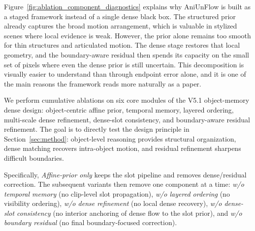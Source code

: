 Figure~\ref{fig:ablation_component_diagnostics} explains why AniUnFlow is built as a staged framework instead of a single dense black box. The structured prior already captures the broad motion arrangement, which is valuable in stylized scenes where local evidence is weak. However, the prior alone remains too smooth for thin structures and articulated motion. The dense stage restores that local geometry, and the boundary-aware residual then spends its capacity on the small set of pixels where even the dense prior is still uncertain. This decomposition is visually easier to understand than through endpoint error alone, and it is one of the main reasons the framework reads more naturally as a paper.

We perform cumulative ablations on six core modules of the V5.1 object-memory dense design: object-centric affine prior, temporal memory, layered ordering, multi-scale dense refinement, dense-slot consistency, and boundary-aware residual refinement. The goal is to directly test the design principle in Section~\ref{sec:method}: object-level reasoning provides structural organization, dense matching recovers intra-object motion, and residual refinement sharpens difficult boundaries.

Specifically, \emph{Affine-prior only} keeps the slot pipeline and removes dense/residual correction. The subsequent variants then remove one component at a time: \emph{w/o temporal memory} (no clip-level slot propagation), \emph{w/o layered ordering} (no visibility ordering), \emph{w/o dense refinement} (no local dense recovery), \emph{w/o dense-slot consistency} (no interior anchoring of dense flow to the slot prior), and \emph{w/o boundary residual} (no final boundary-focused correction).

\begin{table}[t]
\centering
\caption{Cumulative ablation on AnimeRun. Lower EPE is better; higher threshold accuracy is better.}
\label{tab:ablation_results}
\footnotesize
\setlength{\tabcolsep}{3pt}
\renewcommand{\arraystretch}{1.10}
\end{table}

